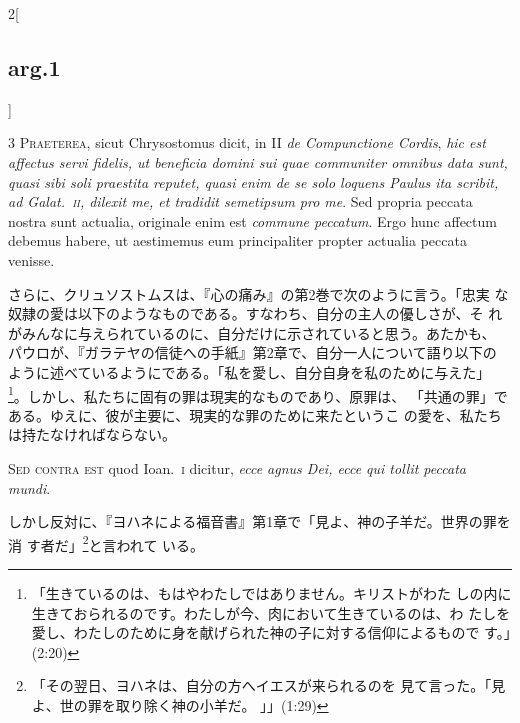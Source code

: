 \documentclass[paper=a4paper,fontsize=10pt,jafontsize=9pt,titlepage]{jlreq}
\begin{document}
\begin{paracol}{2}[\subsection{arg.1}]

3 {\scshape Praeterea}, sicut Chrysostomus dicit, in II
{\itshape de Compunctione Cordis}, {\itshape hic est affectus servi fidelis, ut beneficia
domini sui quae communiter omnibus data sunt, quasi sibi soli praestita
reputet, quasi enim de se solo loquens Paulus ita scribit, {\itshape ad Galat}.~{\scshape ii},
dilexit me, et tradidit semetipsum pro me}. Sed propria peccata nostra
sunt actualia, originale enim est {\itshape commune peccatum}. Ergo hunc affectum
debemus habere, ut aestimemus eum principaliter propter actualia peccata
venisse.

\switchcolumn

さらに、クリュソストムスは、『心の痛み』の第2巻で次のように言う。「忠実
 な奴隷の愛は以下のようなものである。すなわち、自分の主人の優しさが、そ
 れがみんなに与えられているのに、自分だけに示されていると思う。あたかも、
 パウロが、『ガラテヤの信徒への手紙』第2章で、自分一人について語り以下の
 ように述べているようにである。「私を愛し、自分自身を私のために与えた」
 \footnote{「生きているのは、もはやわたしではありません。キリストがわた
 しの内に生きておられるのです。わたしが今、肉において生きているのは、わ
 たしを愛し、わたしのために身を献げられた神の子に対する信仰によるもので
 す。」(2:20) }。しかし、私たちに固有の罪は現実的なものであり、原罪は、
 「共通の罪」である。ゆえに、彼が主要に、現実的な罪のために来たというこ
 の愛を、私たちは持たなければならない。

\switchcolumn*[\subsection{s.c.}]

{\scshape Sed contra est} quod Ioan.~{\scshape i} dicitur, {\itshape ecce
agnus Dei, ecce qui tollit peccata mundi}.

\switchcolumn

しかし反対に、『ヨハネによる福音書』第1章で「見よ、神の子羊だ。世界の罪を消
 す者だ」\footnote{「その翌日、ヨハネは、自分の方へイエスが来られるのを
 見て言った。「見よ、世の罪を取り除く神の小羊だ。 」」(1:29)}と言われて
 いる。



\end{paracol}
\end{document}
